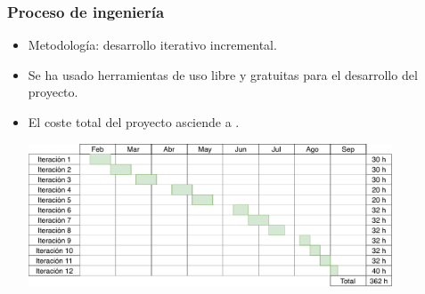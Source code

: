 \begin{frame}
\frametitle{Proceso de ingeniería}

\begin{itemize}
	\item<1-> Metodología: \textcolor{UDCpink}{desarrollo iterativo incremental}.
	
	\vspace{0.5em}
	
	\item<2-> Se ha usado herramientas de \textcolor{UDCpink}{uso libre y gratuitas} para el desarrollo del proyecto.
	
	\vspace{0.5em}
	
	\item<3-> El coste total del proyecto asciende a \textcolor{UDCpink}{}.
	
	\vspace{1em}
	
	\pause[4]
	
	\begin{center}
		\includegraphics[width=0.85\textwidth]{images/gantt.pdf}
	\end{center}
	
\end{itemize}

\end{frame}